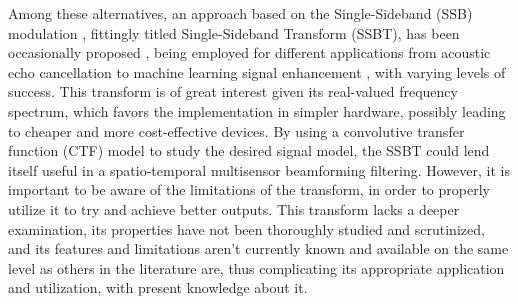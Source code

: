 
Among these alternatives, an approach based on the Single-Sideband (SSB) modulation \cite{chen_hybrid_2021,xing_single_2017}, fittingly titled Single-Sideband Transform (SSBT), has been occasionally proposed \cite{crochiere_multirate_1983,oyzerman_system_2012}, being employed for different applications from acoustic echo cancellation \cite{chin_subband_2001} to machine learning signal enhancement \cite{okamoto_subband_2017}, with varying levels of success. This transform is of great interest given its real-valued frequency spectrum, which favors the implementation in simpler hardware, possibly leading to cheaper and more cost-effective devices. By using a convolutive transfer function (CTF) model \cite{talmon_relative_2009} to study the desired signal model, the SSBT could lend itself useful in a spatio-temporal multisensor beamforming filtering. However, it is important to be aware of the limitations of the transform, in order to properly utilize it to try and achieve better outputs. This transform lacks a deeper examination, its properties have not been thoroughly studied and scrutinized, and its features and limitations aren't currently known and available on the same level as others in the literature are, thus complicating its appropriate application and utilization, with present knowledge about it.


